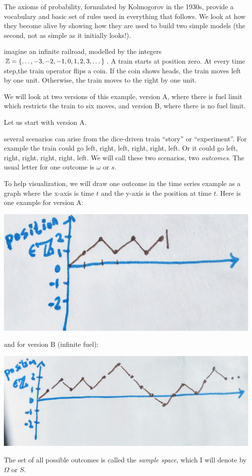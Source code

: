 \documentclass{article}
\begin{document}
The axioms of probability, formulated by Kolmogorov in the 1930s, provide a vocabulary and basic set of rules used in everything that follows. We look at how they become alive by showing how they are used to build two simple models (the second, not as simple as it initially looks!).

 imagine an infinite railroad, modelled by the integers ${\mathbb Z} = \{\dots, -3, -2, -1, 0, 1, 2, 3, \dots\}$. A train starts at position zero. At every time step,the train operator flips a coin. If the coin shows heads, the train moves left by one unit. Otherwise, the train moves to the right by one unit. 

We will look at two versions of this example, version A, where there is fuel limit which restricts the train to six moves, and version B, where there is no fuel limit. 

Let us start with version A. 

 several scenarios can arise from the dice-driven train ``story'' or ``experiment''. For example the train could go left, right, left, right, right, left. Or it could go left, right, right, right, right, left. We will call these two scenarios, two \emph{outcomes}. The usual letter for one outcome is $\omega$ or $s$. 

To help visualization, we will draw one outcome in the time series example as a graph where the x-axis is time $t$ and the y-axis is the position at time $t$. Here is one example for version A:
\begin{center}
\includegraphics[width=0.5\linewidth]{figures/train1}
\end{center}
and for version B (infinite fuel):
\begin{center}
	\includegraphics[width=0.5\linewidth]{figures/train2}
\end{center}

 The set of all possible outcomes is called the \emph{sample space}, which I will denote by $\Omega$ or $S$. 
\end{document}
